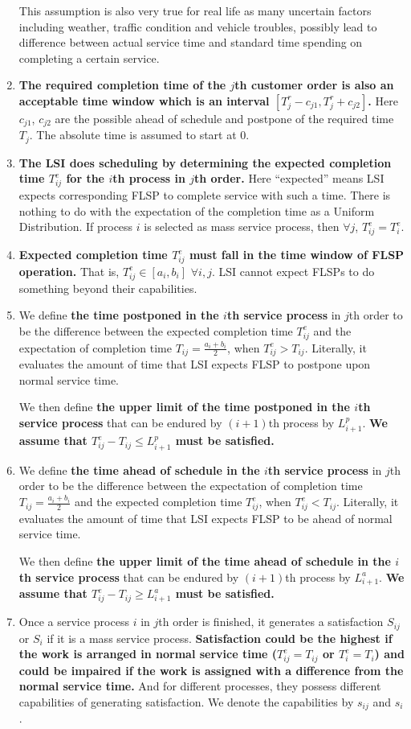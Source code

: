 \documentclass{llncs}
\begin{document}
\begin{enumerate}
    This assumption is also very true for real life as many uncertain factors including weather, traffic condition and vehicle troubles, possibly lead to difference between actual service time and standard time spending on completing a certain service.
    \item \textbf{The required completion time of the $j$th customer order is also an acceptable time window which is an interval $[T_j^r-c_{j1},T_j^r+c_{j2}]$.} Here $c_{j1}$, $c_{j2}$ are the possible ahead of schedule and postpone of the required time $T_j$. The absolute time is assumed to start at 0.
    \item \textbf{The LSI does scheduling by determining the expected completion time $T_{ij}^e$ for the $i$th process in $j$th order.} Here ``expected'' means LSI expects corresponding FLSP to complete service with such a time. There is nothing to do with the expectation of the completion time as a Uniform Distribution. If process $i$ is selected as mass service process, then $\forall j$, $T_{ij}^e=T_i^e$.
    \item\label{ass-extra} \textbf{Expected completion time $T_{ij}^e$ must fall in the time window of FLSP operation.} That is, $T_{ij}^e\in [a_i,b_i]$ $\forall i,j$. LSI cannot expect FLSPs to do something beyond their capabilities.
    \item We define \textbf{the time postponed in the $i$th service process}  in $j$th order to be the difference between the expected completion time $T_{ij}^e$ and the expectation of completion time $T_{ij}=\frac{a_i+b_i}{2}$, when $T_{ij}^e>T_{ij}$. Literally, it evaluates the amount of time that LSI expects FLSP to postpone upon normal service time.
    
    We then define \textbf{the upper limit of the time postponed in the $i$th service process} that can be endured by $(i+1)$th process by $L_{i+1}^p$. \textbf{We assume that $T_{ij}^e-T_{ij}\leq L_{i+1}^p$ must be satisfied.} 
    \item We define \textbf{the time ahead of schedule in the $i$th service process} in $j$th order to be the difference between the expectation of completion time $T_{ij}=\frac{a_i+b_i}{2}$ and the expected completion time $T_{ij}^e$, when $T_{ij}^e<T_{ij}$. Literally, it evaluates the amount of time that LSI expects FLSP to be ahead of normal service time.
    
    We then define \textbf{the upper limit of the time ahead of schedule in the $i$th service process} that can be endured by $(i+1)$th process by $L_{i+1}^a$. \textbf{We assume that $T_{ij}^e-T_{ij}\geq L_{i+1}^a$ must be satisfied.}
    \item\label{ass-goal} Once a service process $i$ in $j$th order is finished, it generates a satisfaction $S_{ij}$ or $S_i$ if it is a mass service process. \textbf{Satisfaction could be the highest if the work is arranged in normal service time ($T_{ij}^e=T_{ij}$ or $T_{i}^e=T_{i}$) and could be impaired if the work is assigned with a difference from the normal service time.} And for different processes, they possess different capabilities of generating satisfaction. We denote the capabilities by $s_{ij}$ and $s_i$.
    

\end{enumerate}
\end{document}
